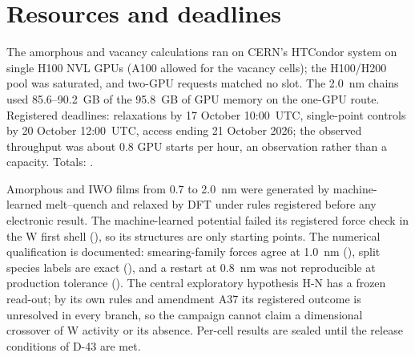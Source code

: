 \section{Resources and deadlines}
\label{sec:mono-am-resources}

The amorphous and vacancy calculations ran on CERN's HTCondor system \citep{Thain2005} on single H100 NVL GPUs (A100
allowed for the vacancy cells); the H100/H200 pool was saturated, and two-GPU requests matched no slot. The 2.0~nm
chains used 85.6--90.2~GB of the 95.8~GB of GPU memory on the one-GPU route. Registered deadlines: relaxations by
17 October 10:00~UTC, single-point controls by 20 October 12:00~UTC, access ending 21 October 2026; the observed
throughput was about 0.8 GPU starts per hour, an observation rather than a capacity. Totals: .

\begin{keyresult}
Amorphous \InO{} and IWO films from 0.7 to 2.0~nm were generated by machine-learned melt--quench and relaxed by DFT
under rules registered before any electronic result. The machine-learned potential failed its registered force check
in the W first shell (), so its structures are only starting points. The numerical qualification is
documented: smearing-family forces agree at 1.0~nm (), split species labels are exact (), and a
restart at 0.8~nm was not reproducible at production tolerance (). The central exploratory hypothesis H-N
has a frozen read-out; by its own rules and amendment A37 its registered outcome is unresolved in every branch, so the
campaign cannot claim a dimensional crossover of W activity or its absence. Per-cell results are sealed until the
release conditions of D-43 are met.
\end{keyresult}
